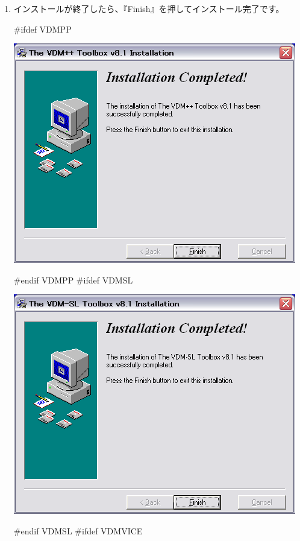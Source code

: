 \documentclass[\pformat,12pt]{jarticle}
\begin{document}
\begin{enumerate}
\item インストールが終了したら、『Finish』を押してインストール完了です。

#ifdef VDMPP
\begin{center}
\includegraphics[scale=0.42,bb=0 0 467 364]{install_pp_finish.png}
\end{center}
#endif VDMPP
#ifdef VDMSL
\begin{center}
\includegraphics[scale=0.42,bb=0 0 467 364]{install_sl_finish.png}
\end{center}
#endif VDMSL
#ifdef VDMVICE
\begin{center}

\end{center}
\end{enumerate}
\end{document}
